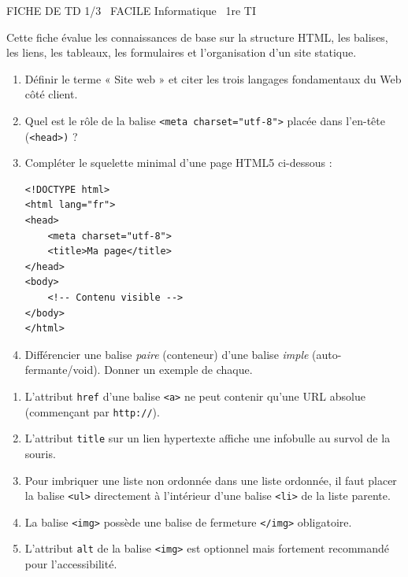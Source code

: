 \documentclass[11pt]{article}
\begin{document}
\begin{tcolorbox}[enhanced,colback=popink,colframe=popink,arc=10pt,boxrule=0pt,left=12pt,right=12pt,top=9pt,bottom=9pt]
{\color{white}\popxbold\small FICHE DE TD 1/3 \textbullet\ FACILE \hfill Informatique \textbullet\ 1re TI\par}
\end{tcolorbox}
\vspace{4pt}
Cette fiche évalue les connaissances de base sur la structure HTML, les balises, les liens, les tableaux, les formulaires et l'organisation d'un site statique.

\begin{exercice}
\begin{enumerate}
    \item Définir le terme « Site web » et citer les trois langages fondamentaux du Web côté client.
    \item Quel est le rôle de la balise \texttt{<meta charset="utf-8">} placée dans l'en-tête (\texttt{<head>)} ?
    \item Compléter le squelette minimal d'une page HTML5 ci-dessous :
\begin{verbatim}
<!DOCTYPE html>
<html lang="fr">
<head>
    <meta charset="utf-8">
    <title>Ma page</title>
</head>
<body>
    <!-- Contenu visible -->
</body>
</html>
\end{verbatim}
    \item Différencier une balise \textit{paire} (conteneur) d'une balise \textit{imple} (auto-fermante/void). Donner un exemple de chaque.
\end{enumerate}
\end{exercice}

\begin{exercice}
\begin{enumerate}
    \item L'attribut \texttt{href} d'une balise \texttt{<a>} ne peut contenir qu'une URL absolue (commençant par \texttt{http://}).
    \item L'attribut \texttt{title} sur un lien hypertexte affiche une infobulle au survol de la souris.
    \item Pour imbriquer une liste non ordonnée dans une liste ordonnée, il faut placer la balise \texttt{<ul>} directement à l'intérieur d'une balise \texttt{<li>} de la liste parente.
    \item La balise \texttt{<img>} possède une balise de fermeture \texttt{</img>} obligatoire.
    \item L'attribut \texttt{alt} de la balise \texttt{<img>} est optionnel mais fortement recommandé pour l'accessibilité.
\end{enumerate}
\end{exercice}
\end{document}
